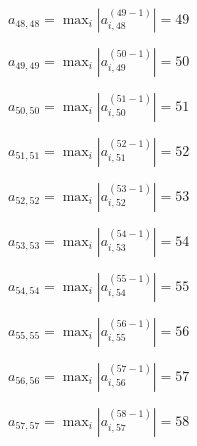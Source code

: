 \documentclass[a4paper,12pt]{article}
\begin{document}
$a _{ 48, 48 } =  \max _i |a _{ i, 48 } ^{ (49 - 1) } | = 49$

$a _{ 49, 49 } =  \max _i |a _{ i, 49 } ^{ (50 - 1) } | = 50$

$a _{ 50, 50 } =  \max _i |a _{ i, 50 } ^{ (51 - 1) } | = 51$

$a _{ 51, 51 } =  \max _i |a _{ i, 51 } ^{ (52 - 1) } | = 52$

$a _{ 52, 52 } =  \max _i |a _{ i, 52 } ^{ (53 - 1) } | = 53$

$a _{ 53, 53 } =  \max _i |a _{ i, 53 } ^{ (54 - 1) } | = 54$

$a _{ 54, 54 } =  \max _i |a _{ i, 54 } ^{ (55 - 1) } | = 55$

$a _{ 55, 55 } =  \max _i |a _{ i, 55 } ^{ (56 - 1) } | = 56$

$a _{ 56, 56 } =  \max _i |a _{ i, 56 } ^{ (57 - 1) } | = 57$

$a _{ 57, 57 } =  \max _i |a _{ i, 57 } ^{ (58 - 1) } | = 58$
\end{document}
